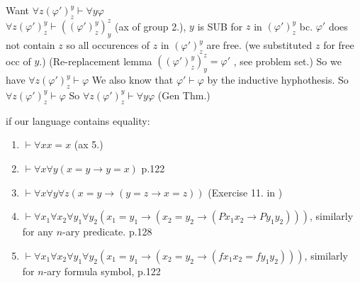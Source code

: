 {\begin{itemize}
\begin{itemize}
\begin{enumerate}
                    Want $\forall z (\varphi')^y_z \vdash \forall y \varphi$ \\
                    $\forall z (\varphi')^y_z \vdash ((\varphi')^y_z)^z_y$ (ax of group 2.), $y$ is SUB for $z$ in $(\varphi')^y_z$ bc.
                    $\varphi'$ does not contain $z$ so all occurences of $z$ in $(\varphi')^y_z$ are free. (we substituted $z$ for free occ of $y$.)
                    (Re-replacement lemma $ ((\varphi')^y_z)^z_y = \varphi'$ , see problem set.)
                    So we have $\forall z (\varphi')^y_z\vdash \varphi$
                    We also know that $\varphi' \vdash \varphi$ by the inductive hyphothesis. 
                    So $\forall z (\varphi')^y_z \vdash \varphi$
                    So $\forall z (\varphi')^y_z \vdash \forall y \varphi$ (Gen Thm.)
                \end{enumerate}
        \end{itemize}
    \end{itemize}
}

if our language contains equality:
\begin{enumerate}
    \item $\vdash \forall x x = x$ (ax 5.)
    \item $\vdash \forall x \forall y (x=y \to y = x)$ p.122
    \item $\vdash \forall x \forall y \forall z (x=y \to (y=z \to x = z))$ (Exercise 11. in \cite{EndertonHerbertB2001AMIt})
    \item $\vdash \forall x_1 \forall x_2 \forall y_1 \forall y_2 (x_1=y_1 \to (x_2=y_2 \to (Px_1x_2 \to Py_1y_2)))$, similarly for any $n$-ary predicate. p.128
    \item $\vdash \forall x_1 \forall x_2 \forall y_1 \forall y_2 (x_1=y_1 \to (x_2 = y_2 \to (fx_1x_2 = fy_1y_2)))$, similarly for $n$-ary formula symbol, p.122
\end{enumerate}


